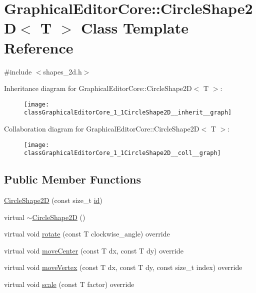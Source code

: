 \hypertarget{classGraphicalEditorCore_1_1CircleShape2D}{}\section{Graphical\+Editor\+Core\+:\+:Circle\+Shape2D$<$ T $>$ Class Template Reference}
\label{classGraphicalEditorCore_1_1CircleShape2D}


{\ttfamily \#include $<$shapes\+\_\+2d.\+h$>$}



Inheritance diagram for Graphical\+Editor\+Core\+:\+:Circle\+Shape2D$<$ T $>$\+:
\nopagebreak
\begin{figure}[H]
\begin{center}
\leavevmode
\texttt{[image: classGraphicalEditorCore\_1\_1CircleShape2D\_\_inherit\_\_graph]}
\end{center}
\end{figure}


Collaboration diagram for Graphical\+Editor\+Core\+:\+:Circle\+Shape2D$<$ T $>$\+:
\nopagebreak
\begin{figure}[H]
\begin{center}
\leavevmode
\texttt{[image: classGraphicalEditorCore\_1\_1CircleShape2D\_\_coll\_\_graph]}
\end{center}
\end{figure}
\subsection*{Public Member Functions}
\begin{DoxyCompactItemize}
\item 
\hyperlink{classGraphicalEditorCore_1_1CircleShape2D_ac6e40c6596bafc87cb948f61225955e2}{Circle\+Shape2D} (const size\+\_\+t \hyperlink{classGraphicalEditorCore_1_1BaseShape2D_ac66cfa23289ae36d70ff6b7c41dd791f}{id})
\item 
virtual \hyperlink{classGraphicalEditorCore_1_1CircleShape2D_a8dac5c648f62af0e23fa50442d14407b}{$\sim$\+Circle\+Shape2D} ()
\item 
virtual void \hyperlink{classGraphicalEditorCore_1_1CircleShape2D_a587709b51a3b79c915c4939c65be178c}{rotate} (const T clockwise\+\_\+angle) override
\item 
virtual void \hyperlink{classGraphicalEditorCore_1_1CircleShape2D_a9bead68f8bd2224fe5e7a39d8e20f597}{move\+Center} (const T dx, const T dy) override
\item 
virtual void \hyperlink{classGraphicalEditorCore_1_1CircleShape2D_a833ad46ff3fd7e262238c332f50289e0}{move\+Vertex} (const T dx, const T dy, const size\+\_\+t index) override
\item 
virtual void \hyperlink{classGraphicalEditorCore_1_1CircleShape2D_aac68ae27380865c53a7a5e20b124725b}{scale} (const T factor) override
\end{DoxyCompactItemize}


